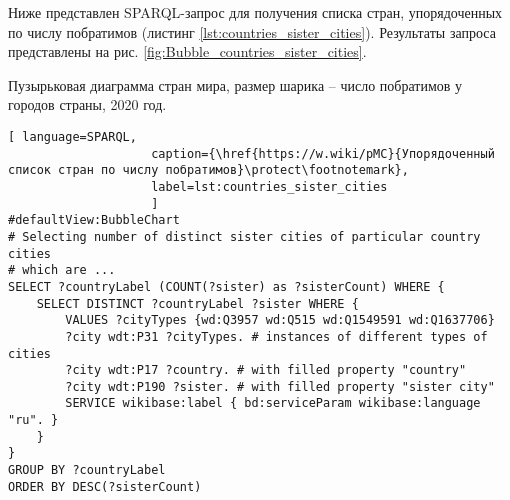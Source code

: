 
Ниже представлен SPARQL-запрос для получения списка стран, упорядоченных по числу побратимов (листинг \ref{lst:countries_sister_cities}). Результаты запроса представлены на рис. \ref{fig:Bubble_countries_sister_cities}.

\begin{marginfigure}[0.5cm]
{
\setlength{\fboxsep}{0pt}%
\setlength{\fboxrule}{1pt}%
%
}
  \caption[Пузырьковая диаграмма стран мира по числу побратимов у городов, 2020 год.]{Пузырьковая диаграмма стран мира, размер шарика -- число побратимов у городов страны, 2020 год.}%
  \label{fig:Bubble_countries_sister_cities}%
\end{marginfigure}

\begin{lstlisting}[ language=SPARQL, 
                    caption={\href{https://w.wiki/pMC}{Упорядоченный список стран по числу побратимов}\protect\footnotemark},
                    label=lst:countries_sister_cities
                    ]
#defaultView:BubbleChart
# Selecting number of distinct sister cities of particular country cities 
# which are ... 
SELECT ?countryLabel (COUNT(?sister) as ?sisterCount) WHERE { 
	SELECT DISTINCT ?countryLabel ?sister WHERE {
		VALUES ?cityTypes {wd:Q3957 wd:Q515 wd:Q1549591 wd:Q1637706}
		?city wdt:P31 ?cityTypes. # instances of different types of cities
		?city wdt:P17 ?country. # with filled property "country"
		?city wdt:P190 ?sister. # with filled property "sister city"
		SERVICE wikibase:label { bd:serviceParam wikibase:language "ru". }
	}                                 
}
GROUP BY ?countryLabel
ORDER BY DESC(?sisterCount)
\end{lstlisting}


